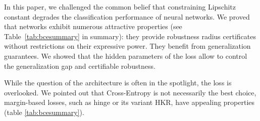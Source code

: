     
  
In this paper, we challenged the common belief that constraining Lipschitz constant degrades the classification performance of neural networks. We proved that \LipCl networks exhibit numerous attractive properties (see Table~\ref{tab:bcesummary} in summary): they provide robustness radius certificates without restrictions on their expressive power. They benefit from generalization guarantees. We showed that the hidden parameters of the loss allow to control the generalization gap and certifiable robustness.  
  
While the question of the \LipCl architecture is often in the spotlight, the loss is overlooked. We pointed out that Cross-Entropy is not necessarily the best choice, margin-based losses, such as hinge or its variant HKR, have appealing properties (table \ref{tab:bcesummary}). %


